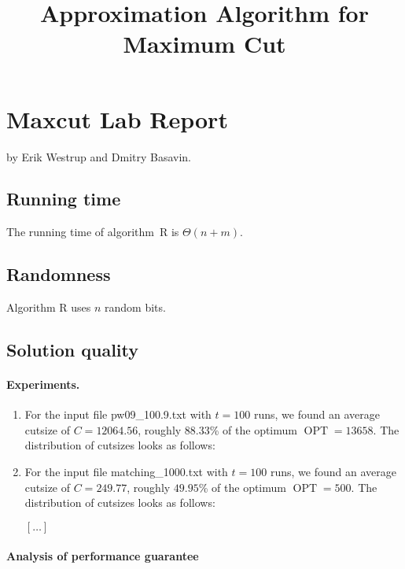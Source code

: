 \documentclass{tufte-handout}
\title{\sf Approximation Algorithm for Maximum Cut}
\begin{document}
\maketitle

\section{Maxcut Lab Report}
by Erik Westrup and Dmitry Basavin.

\subsection{Running time}

The running time of algorithm~R is $\Theta(n + m)$.

\subsection{Randomness}

Algorithm R uses $n$ random bits.

\subsection{Solution quality}

\paragraph{Experiments.}

\begin{enumerate}
\item
For the input file  pw09\_100.9.txt with $t=100$ runs, we found
an average cutsize of $C=12064.56$, roughly $88.33$\% of the optimum
$\operatorname{OPT} = 13658$.
The distribution of cutsizes looks as follows:

\medskip
\noindent


\item
For the input file matching\_1000.txt with $t=100$ runs, we found
an average cutsize of $C=249.77$, roughly $49.95$\% of the optimum
$\operatorname{OPT} = 500$.
The distribution of cutsizes looks as follows:

\medskip
\noindent



$[\ldots]$
\end{enumerate}
\paragraph{Analysis of performance guarantee}
\end{document}
